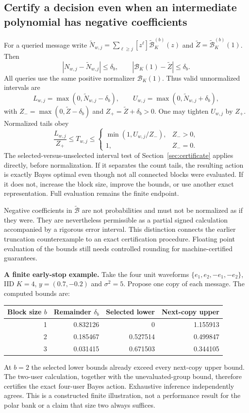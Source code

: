 \documentclass[10pt,a4paper]{article}
\begin{document}
\subsection{Certify a decision even when an intermediate polynomial has negative coefficients}
For a queried message write
$\widetilde N_{w,j}=\sum_{\ell\geq j}[z^\ell]\widetilde{\mathcal B}^{(b)}_K(z)$ and
$\widetilde Z=\widetilde{\mathcal B}^{(b)}_K(1)$. Then
\[
 |N_{w,j}-\widetilde N_{w,j}|\leq\delta_b,\qquad
 |\mathcal B_K(1)-\widetilde Z|\leq\delta_b.
\]
All queries use the same positive normalizer $\mathcal B_K(1)$.
Thus valid unnormalized intervals are
\[
 L_{w,j}=\max(0,\widetilde N_{w,j}-\delta_b),\qquad
 U_{w,j}=\max(0,\widetilde N_{w,j}+\delta_b),
\]
with $Z_-=\max(0,\widetilde Z-\delta_b)$ and $Z_+=\widetilde Z+\delta_b>0$.
One may tighten $U_{w,j}$ by $Z_+$. Normalized tails obey
\[
 \frac{L_{w,j}}{Z_+}\leq T_{w,j}\leq
 \begin{cases}\min(1,U_{w,j}/Z_-),&Z_->0,\\1,&Z_-=0.\end{cases}
\]
The selected-versus-unselected interval test of Section~\ref{sec:certificate} applies directly, before
normalization. If it separates the count tails, the resulting action is exactly Bayes optimal even though not
all connected blocks were evaluated. If it does not, increase the block size, improve the bounds, or use another
exact representation. Full evaluation remains the finite endpoint.

Negative coefficients in $\widetilde{\mathcal B}$ are not probabilities and must not be normalized as if they
were. They are nevertheless permissible as a partial signed calculation accompanied by a rigorous error interval.
This distinction connects the earlier truncation counterexample to an exact certification procedure.
Floating point evaluation of the bounds still needs controlled rounding for machine-certified guarantees.

\textbf{A finite early-stop example.} Take the four unit waveforms $\{e_1,e_2,-e_1,-e_2\}$, IID $K=4$,
$y=(0.7,-0.2)$ and $\sigma^2=5$. Propose one copy of each message. The computed bounds are:
\begin{center}
\begin{tabular}{@{}rrrr@{}}\toprule
Block size $b$ & Remainder $\delta_b$ & Selected lower & Next-copy upper\\\midrule
1 & 0.832126 & 0 & 1.155913\\
2 & 0.185467 & 0.527514 & 0.499847\\
3 & 0.031415 & 0.671503 & 0.344105\\\bottomrule
\end{tabular}
\end{center}
At $b=2$ the selected lower bounds already exceed every next-copy upper bound.
The two-user calculation, together with the unevaluated-group bound, therefore certifies the exact four-user
Bayes action. Exhaustive inference independently agrees. This is a constructed finite illustration, not a
performance result for the polar bank or a claim that size two always suffices.
\end{document}
